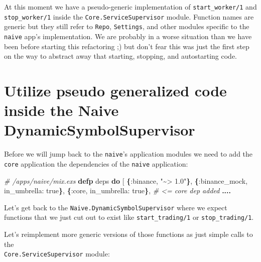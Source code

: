 \documentclass[
  oneside]{book}
\newenvironment{Shaded}{\begin{snugshade}}{\end{snugshade}}
\newcommand{\CommentTok}[1]{\textcolor[rgb]{0.56,0.35,0.01}{\textit{#1}}}
\newcommand{\ConstantTok}[1]{\textcolor[rgb]{0.56,0.35,0.01}{#1}}
\newcommand{\FunctionTok}[1]{\textcolor[rgb]{0.13,0.29,0.53}{\textbf{#1}}}
\newcommand{\KeywordTok}[1]{\textcolor[rgb]{0.13,0.29,0.53}{\textbf{#1}}}
\newcommand{\NormalTok}[1]{#1}
\newcommand{\OperatorTok}[1]{\textcolor[rgb]{0.81,0.36,0.00}{\textbf{#1}}}
\newcommand{\OtherTok}[1]{\textcolor[rgb]{0.56,0.35,0.01}{#1}}
\newcommand{\StringTok}[1]{\textcolor[rgb]{0.31,0.60,0.02}{#1}}
\newcommand{\VariableTok}[1]{\textcolor[rgb]{0.00,0.00,0.00}{#1}}
\begin{document}
At this moment we have a pseudo-generic implementation of \texttt{start\_worker/1} and \texttt{stop\_worker/1} inside the \texttt{Core.ServiceSupervisor} module. Function names are generic but they still refer to \texttt{Repo}, \texttt{Settings}, and other modules specific to the \texttt{naive} app's implementation. We are probably in a worse situation than we have been before starting this refactoring ;) but don't fear this was just the first step on the way to abstract away that starting, stopping, and autostarting code.

\section{Utilize pseudo generalized code inside the Naive DynamicSymbolSupervisor}\label{utilize-pseudo-generalized-code-inside-the-naive-dynamicsymbolsupervisor}

Before we will jump back to the \texttt{naive}'s application modules we need to add the \texttt{core} application the dependencies of the \texttt{naive} application:

\begin{Shaded}
\begin{Highlighting}[]
  \CommentTok{\# /apps/naive/mix.exs}
  \KeywordTok{defp}\NormalTok{ deps }\KeywordTok{do}
    \OtherTok{[}
      \FunctionTok{\{}\VariableTok{:binance}\NormalTok{, }\StringTok{"\textasciitilde{}\textgreater{} 1.0"}\FunctionTok{\}}\NormalTok{,}
      \FunctionTok{\{}\VariableTok{:binance\_mock}\NormalTok{, }\VariableTok{in\_umbrella:} \ConstantTok{true}\FunctionTok{\}}\NormalTok{,}
      \FunctionTok{\{}\VariableTok{:core}\NormalTok{, }\VariableTok{in\_umbrella:} \ConstantTok{true}\FunctionTok{\}}\NormalTok{, }\CommentTok{\# \textless{}= core dep added }
      \OperatorTok{....}
\end{Highlighting}
\end{Shaded}

Let's get back to the \texttt{Naive.DynamicSymbolSupervisor} where we expect functions that we just cut out to exist like \texttt{start\_trading/1} or \texttt{stop\_trading/1}.

Let's reimplement more generic versions of those functions as just simple calls to the\\
\texttt{Core.ServiceSupervisor} module:
\end{document}
